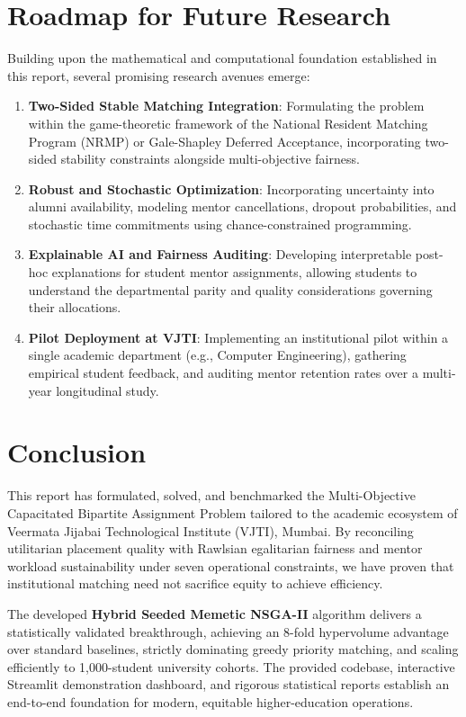 \section{Roadmap for Future Research}
Building upon the mathematical and computational foundation established in this report, several promising research avenues emerge:
\begin{enumerate}
    \item \textbf{Two-Sided Stable Matching Integration}: Formulating the problem within the game-theoretic framework of the National Resident Matching Program (NRMP) or Gale-Shapley Deferred Acceptance, incorporating two-sided stability constraints alongside multi-objective fairness.
    \item \textbf{Robust and Stochastic Optimization}: Incorporating uncertainty into alumni availability, modeling mentor cancellations, dropout probabilities, and stochastic time commitments using chance-constrained programming.
    \item \textbf{Explainable AI and Fairness Auditing}: Developing interpretable post-hoc explanations for student mentor assignments, allowing students to understand the departmental parity and quality considerations governing their allocations.
    \item \textbf{Pilot Deployment at VJTI}: Implementing an institutional pilot within a single academic department (e.g., Computer Engineering), gathering empirical student feedback, and auditing mentor retention rates over a multi-year longitudinal study.
\end{enumerate}

\section{Conclusion}
This report has formulated, solved, and benchmarked the Multi-Objective Capacitated Bipartite Assignment Problem tailored to the academic ecosystem of Veermata Jijabai Technological Institute (VJTI), Mumbai. By reconciling utilitarian placement quality with Rawlsian egalitarian fairness and mentor workload sustainability under seven operational constraints, we have proven that institutional matching need not sacrifice equity to achieve efficiency. 

The developed \textbf{Hybrid Seeded Memetic NSGA-II} algorithm delivers a statistically validated breakthrough, achieving an 8-fold hypervolume advantage over standard baselines, strictly dominating greedy priority matching, and scaling efficiently to 1,000-student university cohorts. The provided codebase, interactive Streamlit demonstration dashboard, and rigorous statistical reports establish an end-to-end foundation for modern, equitable higher-education operations.

